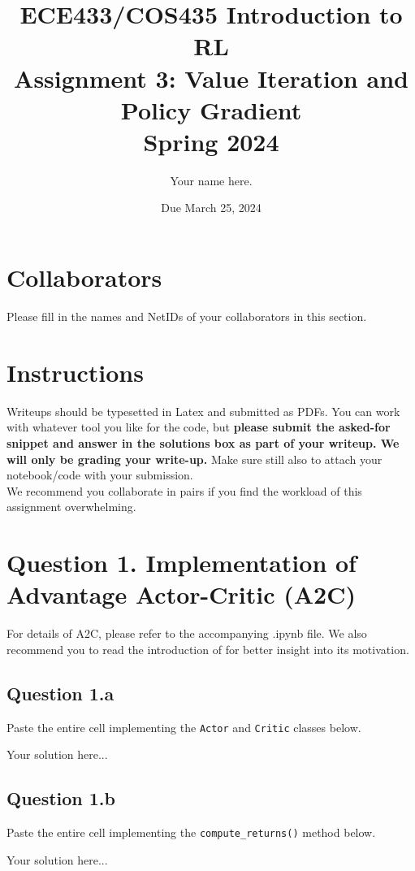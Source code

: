 \documentclass[12pt]{article}
\date{Due March 25, 2024}
\author{\begin{fillme}[width=0.3\textwidth]
 Your name here.
\end{fillme}} %
\title{ECE433/COS435 Introduction to RL\\
  Assignment 3: Value Iteration and Policy Gradient\\
  Spring 2024\\
}
\begin{document}
  \maketitle
  \section*{Collaborators}
\begin{fillme}
 Please fill in the names and NetIDs of your collaborators in this section.
\end{fillme}

\section*{Instructions}

Writeups should be typesetted in Latex and submitted as PDFs. You can work with whatever tool you like for the code, but \textbf{please submit the asked-for snippet and answer in the solutions box as part of your writeup. We will only be grading your write-up.} Make sure still also to attach your notebook/code with your submission.\\


\noindent We recommend you collaborate in pairs if you find the workload of this assignment overwhelming.

\section*{Question 1. Implementation of Advantage Actor-Critic (A2C)}
For details of A2C, please refer to the accompanying .ipynb file. We also recommend you to read the introduction of  \cite{lillicrap2019continuous} for better insight into its motivation.
\subsection*{Question 1.a}
Paste the entire cell implementing the \texttt{Actor} and \texttt{Critic} classes below. 
\begin{solution}
Your solution here...
\end{solution}

\subsection*{Question 1.b}
Paste the entire cell implementing the \texttt{compute\_returns()} method below.
\begin{solution}
Your solution here...
\end{solution}
\end{document}

